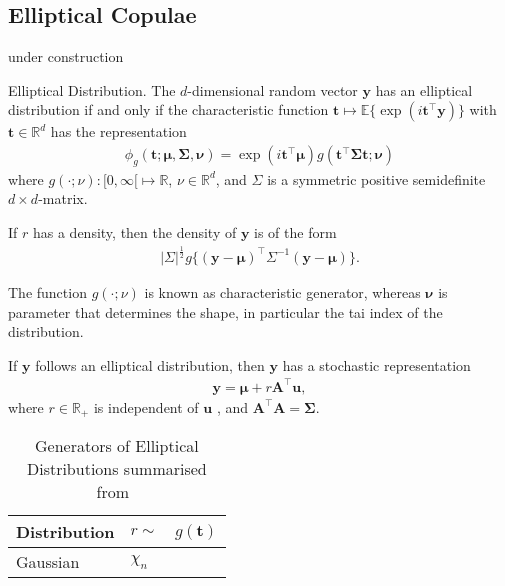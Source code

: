 \subsection{Elliptical Copulae}\label{subsec:elliptical-copulae}
    under construction

\begin{definition}
    Elliptical Distribution.
    The $d$-dimensional random vector $\pmb{y}$ has an elliptical distribution if and only if the characteristic function
    $\pmb{t} \mapsto \mathbb{E}\{\exp(i\pmb{t}^\top \pmb{y})\}$ with $\pmb{t} \in \mathbb{R}^d$ has the representation
    \begin{align}
        \phi_g(\pmb{t}; \pmb{\mu}, \pmb{\Sigma}, \pmb{\nu}) = \exp(i\pmb{t}^\top\pmb{\mu})g(\pmb{t}^\top\pmb{\Sigma}\pmb{t};\pmb{\nu})
        \end{align}
    where $g(\cdot;\nu):[0, \infty[ \mapsto \mathbb{R}$, $\nu \in \mathbb{R}^d$, and $\Sigma$ is a symmetric positive semidefinite $d\times d$-matrix.
    \end{definition}

If $r$ has a density, then the density of $\pmb{y}$ is of the form
\begin{align}
    |\Sigma|^{\frac{1}{2}} g\{(\pmb{y} - \pmb{\mu})^\top \Sigma^{-1}(\pmb{y} - \pmb{\mu})\}.
    \end{align}

The function $g(\cdot; \nu)$ is known as characteristic generator, whereas $\pmb{\nu}$ is parameter that determines the shape, in particular the tai index of the distribution.





\begin{corollary} \citep[equation 2.12]{fang2018symmetric}
    If $\pmb{y}$ follows an elliptical distribution, then $\pmb{y}$ has a stochastic representation
    \begin{align}\label{eq:stochastic-representation}
        \pmb{y} = \pmb{\mu} + r\pmb{A}^\top \pmb{u},
        \end{align}
    where $r \in \mathbb{R}_+$ is independent of
    $\pmb{u}$
    , and $\pmb{A}^\top\pmb{A}=\pmb{\Sigma}$.
    \end{corollary}

\begin{table}[ht]
    \center
    \begin{tabular}{lll}
    Distribution & $r \sim$ & $g(\pmb{t})$\\ \hline
    Gaussian & $\chi_n$ &
        \end{tabular}
    \caption{Generators of Elliptical Distributions summarised from~\cite[Chapter 2]{fang2018symmetric}}
    \label{tab:table}
\end{table}


